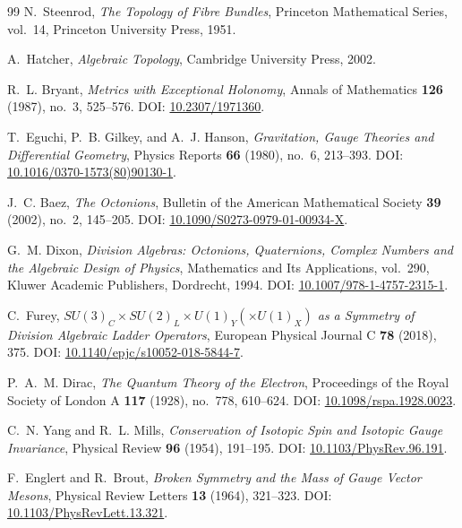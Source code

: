 \begin{thebibliography}{99}
N.~Steenrod,
\emph{The Topology of Fibre Bundles},
Princeton Mathematical Series, vol.~14,
Princeton University Press, 1951.

A.~Hatcher,
\emph{Algebraic Topology},
Cambridge University Press, 2002.

R.~L. Bryant,
\emph{Metrics with Exceptional Holonomy},
Annals of Mathematics \textbf{126} (1987), no.~3, 525--576.
\newblock DOI: \href{https://doi.org/10.2307/1971360}{10.2307/1971360}.

T.~Eguchi, P.~B. Gilkey, and A.~J. Hanson,
\emph{Gravitation, Gauge Theories and Differential Geometry},
Physics Reports \textbf{66} (1980), no.~6, 213--393.
\newblock DOI: \href{https://doi.org/10.1016/0370-1573(80)90130-1}{10.1016/0370-1573(80)90130-1}.

J.~C. Baez,
\emph{The Octonions},
Bulletin of the American Mathematical Society \textbf{39} (2002), no.~2, 145--205.
\newblock DOI: \href{https://doi.org/10.1090/S0273-0979-01-00934-X}{10.1090/S0273-0979-01-00934-X}.

G.~M. Dixon,
\emph{Division Algebras: Octonions, Quaternions, Complex Numbers and the Algebraic Design of Physics},
Mathematics and Its Applications, vol.~290,
Kluwer Academic Publishers, Dordrecht, 1994.
\newblock DOI: \href{https://doi.org/10.1007/978-1-4757-2315-1}{10.1007/978-1-4757-2315-1}.

C.~Furey,
\emph{$SU(3)_C\times SU(2)_L\times U(1)_Y\left(\times U(1)_X\right)$ as a Symmetry of Division Algebraic Ladder Operators},
European Physical Journal C \textbf{78} (2018), 375.
\newblock DOI: \href{https://doi.org/10.1140/epjc/s10052-018-5844-7}{10.1140/epjc/s10052-018-5844-7}.

P.~A.~M. Dirac,
\emph{The Quantum Theory of the Electron},
Proceedings of the Royal Society of London A \textbf{117} (1928), no.~778, 610--624.
\newblock DOI: \href{https://doi.org/10.1098/rspa.1928.0023}{10.1098/rspa.1928.0023}.

C.~N. Yang and R.~L. Mills,
\emph{Conservation of Isotopic Spin and Isotopic Gauge Invariance},
Physical Review \textbf{96} (1954), 191--195.
\newblock DOI: \href{https://doi.org/10.1103/PhysRev.96.191}{10.1103/PhysRev.96.191}.

F.~Englert and R.~Brout,
\emph{Broken Symmetry and the Mass of Gauge Vector Mesons},
Physical Review Letters \textbf{13} (1964), 321--323.
\newblock DOI: \href{https://doi.org/10.1103/PhysRevLett.13.321}{10.1103/PhysRevLett.13.321}.


\end{thebibliography}
